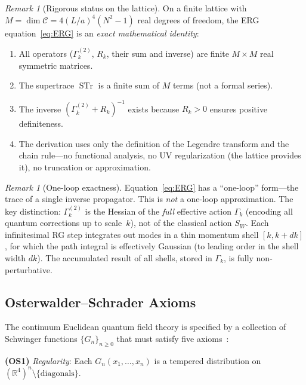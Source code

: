 \documentclass[12pt,a4paper]{article}
\theoremstyle{plain}
\theoremstyle{definition}
\theoremstyle{remark}
\newtheorem{remark}[theorem]{Remark}
\begin{document}
\begin{remark}[Rigorous status on the lattice]\label{rem:rigorous}
On a finite lattice with $M=\dim\mathcal{C}=4(L/a)^4(N^2-1)$ real degrees of freedom, the ERG equation~\eqref{eq:ERG} is an \emph{exact mathematical identity}:
\begin{enumerate}[label=(\roman*),nosep]
\item All operators ($\Gamma_k^{(2)}$, $R_k$, their sum and inverse) are finite $M\times M$ real symmetric matrices.
\item The supertrace $\operatorname{STr}$ is a finite sum of $M$ terms (not a formal series).
\item The inverse $(\Gamma_k^{(2)}+R_k)^{-1}$ exists because $R_k>0$ ensures positive definiteness.
\item The derivation uses only the definition of the Legendre transform and the chain rule---no functional analysis, no UV regularization (the lattice provides it), no truncation or approximation.
\end{enumerate}
\end{remark}

\begin{remark}[One-loop exactness]\label{rem:oneloop}
Equation~\eqref{eq:ERG} has a ``one-loop'' form---the trace of a single inverse propagator. This is \emph{not} a one-loop approximation. The key distinction: $\Gamma_k^{(2)}$ is the Hessian of the \emph{full} effective action $\Gamma_k$ (encoding all quantum corrections up to scale~$k$), not of the classical action $S_W$. Each infinitesimal RG step integrates out modes in a thin momentum shell $[k,k+dk]$, for which the path integral is effectively Gaussian (to leading order in the shell width $dk$). The accumulated result of all shells, stored in $\Gamma_k$, is fully non-perturbative.
\end{remark}

\subsection{Osterwalder--Schrader Axioms}\label{sec:OSaxioms}

The continuum Euclidean quantum field theory is specified by a collection of Schwinger functions $\{G_n\}_{n\geq 0}$ that must satisfy five axioms~\cite{OsterwalderSchrader1973,OsterwalderSchrader1975}:

\noindent\textbf{(OS1)} \textit{Regularity}: Each $G_n(x_1,\ldots,x_n)$ is a tempered distribution on $(\mathbb{R}^4)^n\setminus\{\text{diagonals}\}$.
\end{document}
